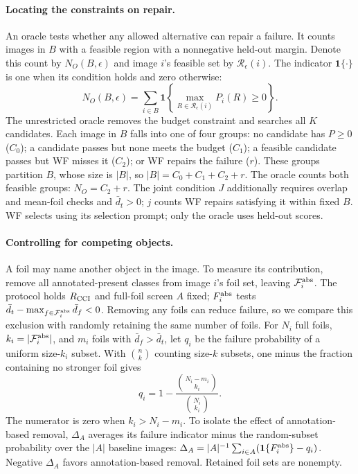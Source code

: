 \documentclass[10pt]{article}
\newcommand{\foils}{\mathcal F}
\newcommand{\regions}{\mathcal R}
\begin{document}
\paragraph{Locating the constraints on repair.}
An oracle tests whether any allowed alternative can repair a failure.
It counts images in $B$ with a feasible region
with a nonnegative held-out margin. Denote this count by $N_O(B,\epsilon)$
and image $i$'s feasible set by $\regions_\epsilon(i)$. The indicator
$\mathbf1\{\cdot\}$ is one when its condition holds and zero otherwise:
\begin{equation}
N_O(B,\epsilon)=\sum_{i\in B}\mathbf1\!\left\{
\max_{R\in\regions_\epsilon(i)}P_i(R)\ge0\right\}.
\label{eq:oracle}
\end{equation}
The unrestricted oracle removes the budget constraint and searches all
$K$ candidates. Each image in $B$ falls into one of four groups: no
candidate has $P\ge0$ ($C_0$); a candidate passes but none meets the
budget ($C_1$); a feasible candidate passes but WF misses it ($C_2$);
or WF repairs the failure ($r$).
These groups partition $B$, whose size is $|B|$, so
$|B|=C_0+C_1+C_2+r$. The oracle counts both feasible groups: $N_O=C_2+r$.
The joint condition $J$ additionally requires overlap and mean-foil checks
and $\bar d_t>0$; $j$ counts WF repairs satisfying it within fixed $B$.
WF selects using its selection prompt; only the oracle uses held-out scores.

\paragraph{Controlling for competing objects.}
A foil may name another object in the image. To measure its contribution,
remove all annotated-present classes from image $i$'s foil set, leaving
$\foils_i^{\rm abs}$. The protocol holds $R_{\rm CCI}$ and full-foil screen $A$ fixed;
$F_i^{\rm abs}$ tests $\bar d_t-\max_{f\in\foils_i^{\rm abs}}\bar d_f<0$.
Removing any foils can reduce failure, so we compare this exclusion with
randomly retaining the same number of foils. For $N_i$ full
foils, $k_i=|\foils_i^{\rm abs}|$, and $m_i$ foils with $\bar d_f>\bar d_t$,
let $q_i$ be the failure probability of a uniform size-$k_i$ subset.
With $\binom{n}{k}$ counting size-$k$ subsets, one minus the fraction
containing no stronger foil gives
\begin{equation}
q_i=1-\frac{\binom{N_i-m_i}{k_i}}{\binom{N_i}{k_i}}.
\label{eq:matched}
\end{equation}
The numerator is zero when $k_i>N_i-m_i$. To isolate the effect of
annotation-based removal, $\Delta_A$ averages its failure indicator minus
the random-subset probability over the $|A|$ baseline images:
$\Delta_A=|A|^{-1}\sum_{i\in A}(\mathbf1\{F_i^{\rm abs}\}-q_i)$.
Negative $\Delta_A$ favors annotation-based removal. Retained foil sets are nonempty.
\end{document}
